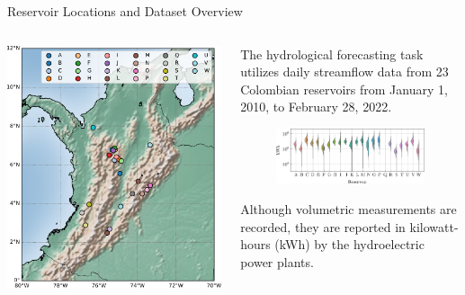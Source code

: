 \begin{frame}{Reservoir Locations and Dataset Overview}
	\begin{columns}[T] %
		\begin{column}{0.45\textwidth}
			\includegraphics[width=\linewidth]{images/colombiamap.pdf}
		
		\end{column}
		\begin{column}{0.55\textwidth}
			\justifying %
			
			The hydrological forecasting task utilizes daily streamflow data from 23 Colombian reservoirs from January 1, 2010, to February 28, 2022.
			\begin{figure}[htbp]
				\centering
				\includegraphics[width=\textwidth]{images/ct_violinplot.pdf}
			\end{figure}
			Although volumetric measurements are recorded, they are reported in kilowatt-hours (kWh) by the hydroelectric power plants.
		\end{column}
	\end{columns}
\end{frame}

